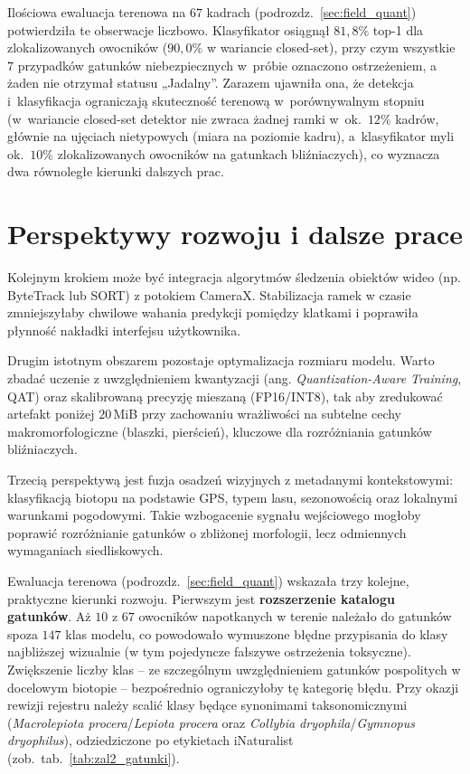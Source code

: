 Ilościowa ewaluacja terenowa na $67$ kadrach (podrozdz.~\ref{sec:field_quant}) potwierdziła te obserwacje liczbowo. Klasyfikator osiągnął $81{,}8\%$ top-1 dla zlokalizowanych owocników ($90{,}0\%$ w wariancie closed-set), przy czym wszystkie $7$ przypadków gatunków niebezpiecznych w~próbie oznaczono ostrzeżeniem, a żaden nie otrzymał statusu „Jadalny”. Zarazem ujawniła ona, że detekcja i~klasyfikacja ograniczają skuteczność terenową w~porównywalnym stopniu (w~wariancie closed-set detektor nie zwraca żadnej ramki w~ok.\ $12\%$ kadrów, głównie na ujęciach nietypowych (miara na poziomie kadru), a~klasyfikator myli ok.\ $10\%$ zlokalizowanych owocników na gatunkach bliźniaczych), co wyznacza dwa równoległe kierunki dalszych prac.

\section{Perspektywy rozwoju i dalsze prace}
Kolejnym krokiem może być integracja algorytmów śledzenia obiektów wideo (np. ByteTrack lub SORT) z potokiem CameraX. Stabilizacja ramek w czasie zmniejszyłaby chwilowe wahania predykcji pomiędzy klatkami i poprawiła płynność nakładki interfejsu użytkownika.

Drugim istotnym obszarem pozostaje optymalizacja rozmiaru modelu. Warto zbadać uczenie z uwzględnieniem kwantyzacji (ang. \textit{Quantization-Aware Training}, QAT) oraz skalibrowaną precyzję mieszaną (FP16/INT8), tak aby zredukować artefakt poniżej $20$\,MiB przy zachowaniu wrażliwości na subtelne cechy makromorfologiczne (blaszki, pierścień), kluczowe dla rozróżniania gatunków bliźniaczych.

Trzecią perspektywą jest fuzja osadzeń wizyjnych z metadanymi kontekstowymi: klasyfikacją biotopu na podstawie GPS, typem lasu, sezonowością oraz lokalnymi warunkami pogodowymi. Takie wzbogacenie sygnału wejściowego mogłoby poprawić rozróżnianie gatunków o zbliżonej morfologii, lecz odmiennych wymaganiach siedliskowych.

Ewaluacja terenowa (podrozdz.~\ref{sec:field_quant}) wskazała trzy kolejne, praktyczne kierunki rozwoju. Pierwszym jest \textbf{rozszerzenie katalogu gatunków}. Aż $10$ z $67$ owocników napotkanych w terenie należało do gatunków spoza $147$ klas modelu, co powodowało wymuszone błędne przypisania do klasy najbliższej wizualnie (w tym pojedyncze fałszywe ostrzeżenia toksyczne). Zwiększenie liczby klas -- ze szczególnym uwzględnieniem gatunków pospolitych w docelowym biotopie -- bezpośrednio ograniczyłoby tę kategorię błędu. Przy okazji rewizji rejestru należy scalić klasy będące synonimami taksonomicznymi (\textit{Macrolepiota procera}/\textit{Lepiota procera} oraz \textit{Collybia dryophila}/\textit{Gymnopus dryophilus}), odziedziczone po etykietach iNaturalist (zob.\ tab.~\ref{tab:zal2_gatunki}).

